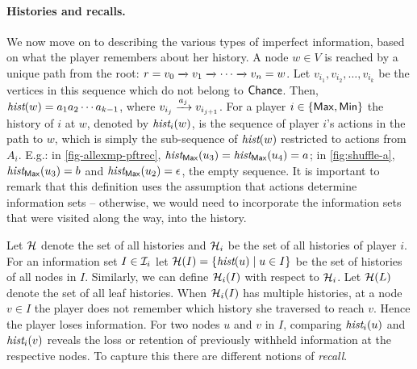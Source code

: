 \paragraph*{Histories and recalls.} We now move on to describing the
various types of imperfect information, based on what the player
remembers about her history. A node $w \in V$ is reached by a unique
path from the root: $r = v_0 \xrightarrow{} v_1 \xrightarrow{} \cdots \xrightarrow{} v_n =
w$. Let $v_{i_1}, v_{i_2}, \dots, v_{i_k}$ be the vertices in this
sequence which do not belong to $\mathsf{Chance}$. Then,
$\textit{hist}(w) = a_{1} a_{2} \cdots a_{k-1}$, where $v_{i_j} \xrightarrow{a_j} v_{i_{j + 1}}$.
For a player $i \in \{\mathsf{Max}, \mathsf{Min}\}$ the history of $i$ at $w$, denoted
by $\textit{hist}_i(w)$, is the sequence of player $i$'s actions in the path to
$w$, which is simply the sub-sequence of $\textit{hist}(w)$ restricted to
actions from $A_i$. E.g.: in \cref{fig-allexmp-pftrec},
$\textit{hist}_{\mathsf{Max}}(u_3) = \textit{hist}_{\mathsf{Max}}(u_4) = a$; in
\cref{fig:shuffle-a}, $\textit{hist}_{\mathsf{Max}}(u_3) = b$ and $\textit{hist}_{\mathsf{Max}}(u_2) = \epsilon$, the empty sequence. It is important to remark that this definition uses the assumption that actions determine information sets -- otherwise, we would need to incorporate the information sets that were visited along the way, into the history.



Let $\mathcal{H}$ denote the set of all histories and $\mathcal{H}_i$ be the set of
all histories of player $i$. For an information set $I \in \mathcal{I}_i$ let
$\mathcal{H}(I) = \{ \textit{hist}(u) \mid u \in I\}$ be the set of histories of all
nodes in $I$. Similarly, we can define $\mathcal{H}_i(I)$ with respect to
$\mathcal{H}_i$. Let $\mathcal{H}(L)$ denote the set of all leaf histories.
When $\mathcal{H}_i(I)$ has multiple histories, at a node $v \in I$ the player
does not remember which history she traversed to reach $v$. Hence the
player loses information. For two
nodes $u$ and $v$ in $I$, comparing $\textit{hist}_i(u)$ and $\textit{hist}_i(v)$
reveals the loss or retention of previously withheld information at
the respective nodes. To capture this there are different notions of
\emph{recall}.

